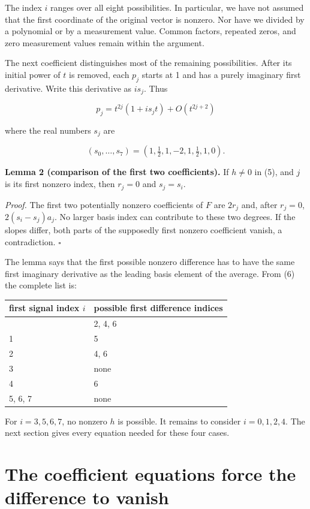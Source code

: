 The index \(i\) ranges over all eight possibilities. In particular, we
have not assumed that the first coordinate of the original vector is
nonzero. Nor have we divided by a polynomial or by a measurement value.
Common factors, repeated zeros, and zero measurement values remain
within the argument.

The next coefficient distinguishes most of the remaining possibilities.
After its initial power of \(t\) is removed, each \(p_j\) starts at 1
and has a purely imaginary first derivative. Write this derivative as
\(is_j\). Thus

\[
p_j=t^{2j}(1+i s_jt)+O(t^{2j+2})
\]

where the real numbers \(s_j\) are

\[
(s_0,\ldots,s_7)=(1,\tfrac12,1,-2,1,\tfrac12,1,0). \tag{6}
\]

\textbf{Lemma 2 (comparison of the first two coefficients).} If
\(h\ne0\) in (5), and \(j\) is its first nonzero index, then \(r_j=0\)
and \(s_j=s_i\).

\emph{Proof.} The first two potentially nonzero coefficients of \(F\)
are \(2r_j\) and, after \(r_j=0\), \(2(s_i-s_j)a_j\). No larger basis
index can contribute to these two degrees. If the slopes differ, both
parts of the supposedly first nonzero coefficient vanish, a
contradiction. \(\square\)

The lemma says that the first possible nonzero difference has to have
the same first imaginary derivative as the leading basis element of the
average. From (6) the complete list is:

{\def\LTcaptype{none} %
\begin{longtable}[]{@{}ll@{}}
\toprule\noalign{}
first signal index \(i\) & possible first difference indices \\
\midrule\noalign{}
\endhead
\bottomrule\noalign{}
\endlastfoot
0 & 2, 4, 6 \\
1 & 5 \\
2 & 4, 6 \\
3 & none \\
4 & 6 \\
5, 6, 7 & none \\
\end{longtable}
}

For \(i=3,5,6,7\), no nonzero \(h\) is possible. It remains to consider
\(i=0,1,2,4\). The next section gives every equation needed for these
four cases.

\section{The coefficient equations force the difference to
vanish}\label{the-coefficient-equations-force-the-difference-to-vanish}

